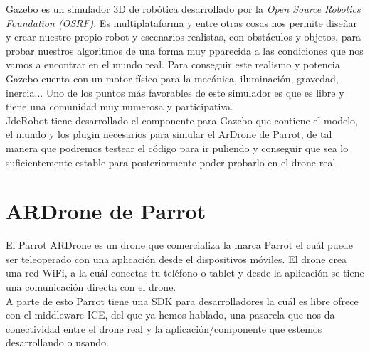 Gazebo es un simulador 3D de robótica desarrollado por la \textit{Open Source Robotics Foundation (OSRF)}. Es multiplataforma y entre otras cosas nos permite diseñar y crear nuestro propio robot y escenarios realistas, con obstáculos y objetos, para probar nuestros algoritmos de una forma muy pparecida a las condiciones que nos vamos a encontrar en el mundo real. Para conseguir este realismo y potencia Gazebo cuenta con un motor físico para la mecánica, iluminación, gravedad, inercia... Uno de los puntos más favorables de este simulador es que es libre y tiene una comunidad muy numerosa y participativa.\\

JdeRobot tiene desarrollado el componente para Gazebo que contiene el modelo, el mundo y los plugin necesarios para simular el ArDrone de Parrot, de tal manera que podremos testear el código para ir puliendo y conseguir que sea lo suficientemente estable para posteriormente poder probarlo en el drone real.


\section{ARDrone de Parrot}

El Parrot ARDrone es un drone que comercializa la marca Parrot el cuál puede ser teleoperado con una aplicación desde el dispositivos móviles. El drone crea una red WiFi, a la cuál conectas tu teléfono o tablet y desde la aplicación se tiene una comunicación directa con el drone.\\

A parte de esto Parrot tiene una SDK para desarrolladores la cuál es libre ofrece con el middleware ICE, del que ya hemos hablado, una pasarela que nos da conectividad entre el drone real y la aplicación/componente que estemos desarrollando o usando.








